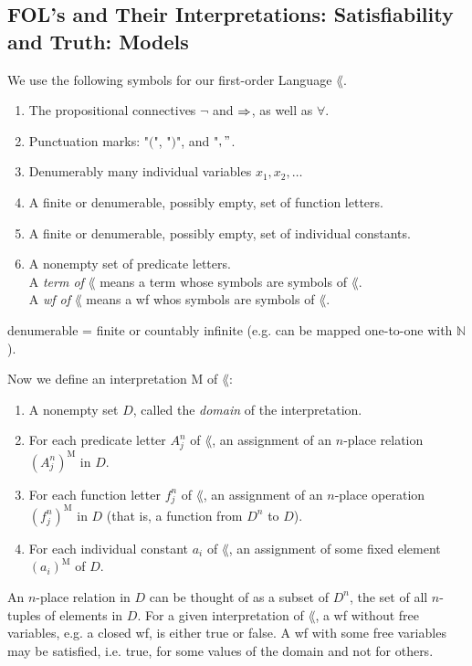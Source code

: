 \subsection{FOL's and Their Interpretations: Satisfiability and Truth: Models}

We use the following symbols for our first-order Language $\lang$.

\begin{enumerate} [label = \alph*.]
    \item The propositional connectives $\lnot$ and $\Rightarrow$, as well as $\forall$.
    \item Punctuation marks: "$($", "$)$", and "$,"$.
    \item Denumerably many individual variables $x_1,x_2, \dots$
    \item A finite or denumerable, possibly empty, set of function letters.
    \item A finite or denumerable, possibly empty, set of individual constants.
    \item A nonempty set of predicate letters.\\
    A \textit{term of} $\lang$ means a term whose symbols are symbols of $\lang$. \\
    A \textit{wf of} $\lang$ means a wf whos symbols are symbols of $\lang$.
\end{enumerate}

 denumerable = finite or countably infinite (e.g. can be mapped one-to-one with $\mathbb{N}$).

Now we define an interpretation M of $\lang$:

\begin{enumerate} [label = \alph*.]
    \item A nonempty set $D$, called the \textit{domain} of the interpretation.
    \item For each predicate letter $A_j^n$ of $\lang$, an assignment of an $n$-place relation $(A_j^n)^{\text{M}}$ in $D$.
    \item For each function letter $f_j^n$ of $\lang$, an assignment of an $n$-place operation $(f_j^n)^{\text{M}}$ in $D$ (that is, a function from $D^n$ to $D$).
    \item For each individual constant $a_i$ of $\lang$, an assignment of some fixed element $(a_i)^{\text{M}}$ of $D$.
\end{enumerate}

An $n$-place relation in $D$ can be thought of as a subset of $D^n$, the set of all $n$-tuples of elements in $D$. For a given interpretation of $\lang$, a wf without free variables, e.g. a closed wf, is either true or false. A wf with some free variables may be satisfied, i.e. true, for some values of the domain and not for others.


